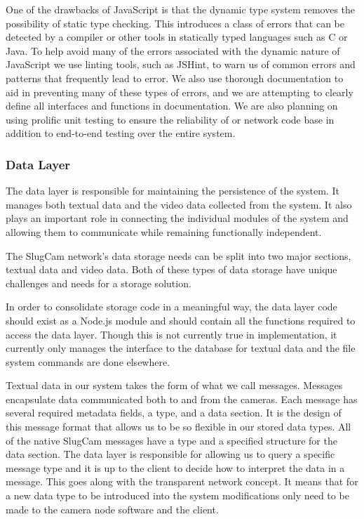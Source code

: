One of the drawbacks of JavaScript is that the dynamic type system removes the
possibility of static type checking. This introduces a class of errors that can
be detected by a compiler or other tools in statically typed languages such as C
or Java. To help avoid many of the errors associated with the dynamic nature of
JavaScript we use linting tools, such as JSHint, to warn us of common errors and
patterns that frequently lead to error. We also use thorough documentation to
aid in preventing many of these types of errors, and we are attempting to clearly
define all interfaces and functions in documentation.  We are also planning on
using prolific unit testing to ensure the reliability of or network code base in
addition to end-to-end testing over the entire system.

\subsubsection{Data Layer}

The data layer is responsible for maintaining the persistence of the system. It
manages both textual data and the video data collected from the system. It also
plays an important role in connecting the individual modules of the system and
allowing them to communicate while remaining functionally independent.

The SlugCam network's data storage needs can be split into two major sections,
textual data and video data. Both of these types of data storage have unique
challenges and needs for a storage solution.

In order to consolidate storage code in a meaningful way, the data layer code
should exist as a Node.js module and should contain all the functions required
to access the data layer. Though this is not currently true in implementation,
it currently only manages the interface to the database for textual data and the
file system commands are done elsewhere.


Textual data in our system takes the form of what we call messages. Messages
encapsulate data communicated both to and from the cameras. Each message has
several required metadata fields, a type, and a data section. It is the design
of this message format that allows us to be so flexible in our stored data
types. All of the native SlugCam messages have a type and a specified structure
for the data section. The data layer is responsible for allowing us to query a
specific message type and it is up to the client to decide how to interpret the
data in a message. This goes along with the transparent network concept. It
means that for a new data type to be introduced into the system modifications
only need to be made to the camera node software and the client.

